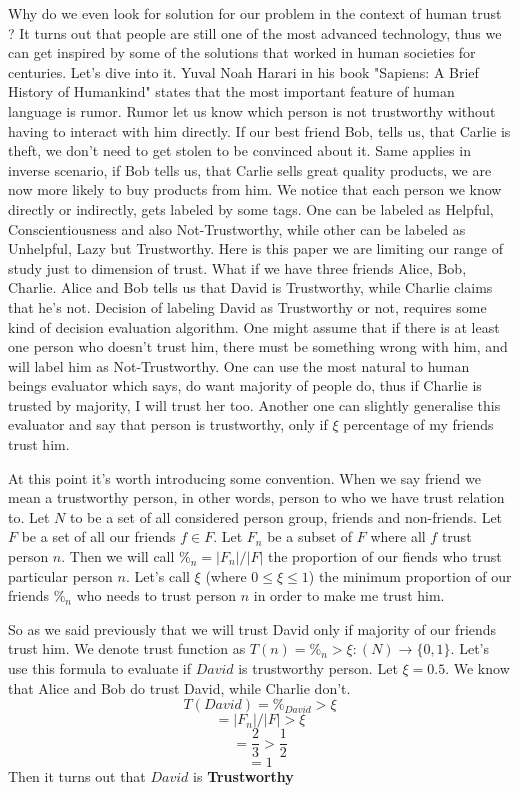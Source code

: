 \documentclass[nostrict]{szablonPG}
\begin{document}
Why do we even look for solution for our problem in the context of human trust ? It turns out that people are still one of the most advanced technology, thus we can get inspired by some of the solutions that worked in human societies for centuries. Let's dive into it.
Yuval Noah Harari in his book "Sapiens: A Brief History of Humankind" states that the most important feature of human language is rumor. Rumor let us know which person is not trustworthy without having to interact with him directly. If our best friend Bob, tells us, that Carlie is theft, we don't need to get stolen to be convinced about it. Same applies in inverse scenario, if Bob tells us, that Carlie sells great quality products, we are now more likely to buy products from him. We notice that each person we know directly or indirectly, gets labeled by some tags. One can be labeled as Helpful, Conscientiousness and also Not-Trustworthy, while other can be labeled as Unhelpful, Lazy but Trustworthy. Here is this paper we are limiting our range of study just to dimension of trust.
What if we have three friends Alice, Bob, Charlie. Alice and  Bob tells us that David is Trustworthy, while Charlie claims that he's not. Decision of labeling David as Trustworthy or not, requires some kind of decision evaluation algorithm.
One might assume that if there is at least one person who doesn't trust him, there must be something wrong with him, and will label him as Not-Trustworthy. One can use the most natural to human beings evaluator which says, do want majority of people do, thus if Charlie is trusted by majority, I will trust her too. Another one can slightly generalise this evaluator and say that person is trustworthy, only if $\xi$ percentage of my friends trust him. 

At this point it's worth introducing some convention. When we say friend we mean a trustworthy person, in other words, person to who we have trust relation to. Let $N$ to be a set of all considered person group, friends and non-friends. Let $F$ be a set of all our friends $f \in F$. Let $F_n$ be a subset of $F$ where all $f$ trust person $n$. Then we will call $\%_n = |F_n|/|F|$ the proportion of our fiends who trust particular person $n$. Let's call $\xi$ (where $0 \le \xi \leq 1$) the minimum proportion of our friends $\%_n$ who needs to trust person $n$ in order to make me trust him. 

So as we said previously that we will trust David only if majority of our friends trust him. We denote trust function as $T(n) = \%_n > \xi : (N) \rightarrow \{0,1\}$. 
Let's use this formula to evaluate if $David$ is trustworthy person. Let $\xi = 0.5$. We know that Alice and Bob do trust David, while Charlie don't.
\[T(David) = \%_{David} > \xi\]
\[= |F_n|/|F| > \xi\]
\[= \frac{2}{3} > \frac{1}{2}\]
\[= 1\]
Then it turns out that $David$ is \textbf{Trustworthy}
\end{document}
